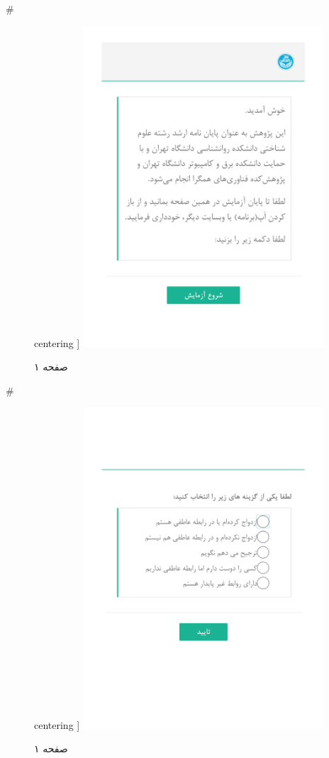 { 
 # 
\begin{figure}[htpb]
centering ]
\includegraphics[width=0.8\textwidth]{./img/Task1.png/}
\caption{صفحه ۱}
\label{fig:Task1}
\end{figure}
 
 
 # 
\begin{figure}[htpb]
centering ]
\includegraphics[width=0.8\textwidth]{./img/Task20.png/}
\caption{صفحه ۱}
\label{fig:Task1}
\end{figure}
 
}
